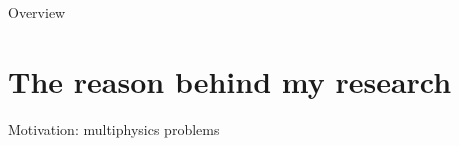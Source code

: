 \documentclass[aspectratio=169]{beamer}
\begin{document}
	
	
	
	
	\begin{frame}[plain]
		
		
		
	\end{frame}
	
	\begin{frame}{Overview}
		\tableofcontents
	\end{frame}
	
	\section{The reason behind my research}
	
	\begin{frame}{Motivation: multiphysics problems}
		

\end{frame}
\end{document}
